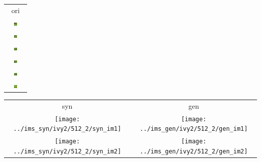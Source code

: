 \documentclass[letter]{article}
\begin{document}
\newpage

\begin{table}[h!]
	\centering
	\begin{tabular}{c}
		ori\tabularnewline
		\includegraphics[width=0.17\textwidth]{../data/ivy2/512/1} \tabularnewline		\includegraphics[width=0.17\textwidth]{../data/ivy2/512/2} \tabularnewline		\includegraphics[width=0.17\textwidth]{../data/ivy2/512/3} \tabularnewline		\includegraphics[width=0.17\textwidth]{../data/ivy2/512/4} \tabularnewline		\includegraphics[width=0.17\textwidth]{../data/ivy2/512/5} \tabularnewline		\includegraphics[width=0.17\textwidth]{../data/ivy2/512/6} \tabularnewline
	\end{tabular}
	\begin{tabular}{cc}
		syn & gen\tabularnewline
		\texttt{[image: ../ims\_syn/ivy2/512\_2/syn\_im1]} & \texttt{[image: ../ims\_gen/ivy2/512\_2/gen\_im1]} \tabularnewline
		\texttt{[image: ../ims\_syn/ivy2/512\_2/syn\_im2]} & \texttt{[image: ../ims\_gen/ivy2/512\_2/gen\_im2]} \tabularnewline

\end{tabular}
\end{table}
\end{document}
